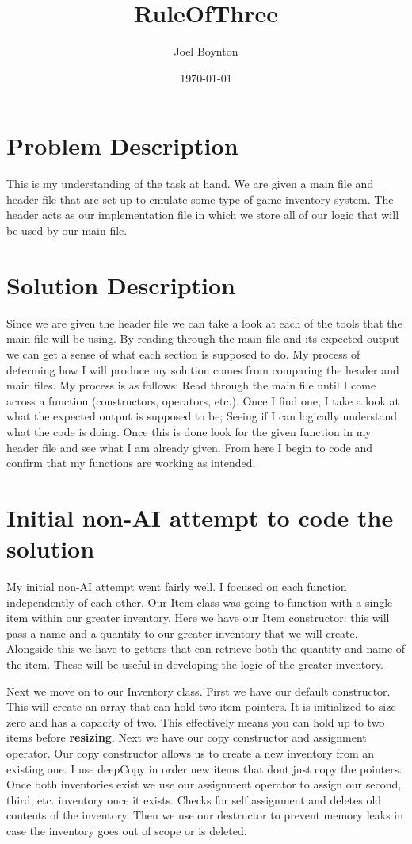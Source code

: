 \documentclass[11pt]{article}
\author{Joel Boynton}
\date{\today}
\title{RuleOfThree}
\begin{document}
\maketitle
\clearpage
\section{Problem Description}
\label{sec:org2b36bad}
This is my understanding of the task at hand. We are given a main file and header file that are set up to emulate some type of game inventory system. The header acts as our implementation file in which we store all of our logic that will be used by our main file.
\section{Solution Description}
\label{sec:org43de50d}
Since we are given the header file we can take a look at each of the tools that the main file will be using. By reading through the main file and its expected output we can get a sense of what each section is supposed to do. My process of determing how I will produce my solution comes from comparing the header and main files. My process is as follows: Read through the main file until I come across a function (constructors, operators, etc.). Once I find one, I take a look at what the expected output is supposed to be; Seeing if I can logically understand what the code is doing. Once this is done look for the given function in my header file and see what I am already given. From here I begin to code and confirm that my functions are working as intended.
\section{Initial non-AI attempt to code the solution}
\label{sec:orgb61d9fc}
My initial non-AI attempt went fairly well. I focused on each function independently of each other. Our Item class was going to function with a single item within our greater inventory. Here we have our Item constructor: this will pass a name and a quantity to our greater inventory that we will create. Alongside this we have to getters that can retrieve both the quantity and name of the item. These will be useful in developing the logic of the greater inventory.

Next we move on to our Inventory class. First we have our default constructor. This will create an array that can hold two item pointers. It is initialized to size zero and has a capacity of two. This effectively means you can hold up to two items before \textbf{resizing}. Next we have our copy constructor and assignment operator. Our copy constructor allows us to create a new inventory from an existing one. I use deepCopy in order new items that dont just copy the pointers. Once both inventories exist we use our assignment operator to assign our second, third, etc. inventory once it exists. Checks for self assignment and deletes old contents of the inventory. Then we use our destructor to prevent memory leaks in case the inventory goes out of scope or is deleted.
\end{document}
